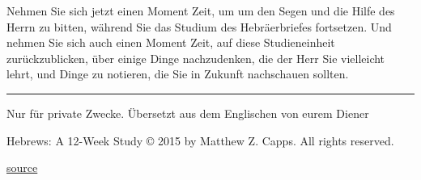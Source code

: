 \documentclass[]{krantz}
\begin{document}
Nehmen Sie sich jetzt einen Moment Zeit, um um den Segen und die Hilfe
des Herrn zu bitten, während Sie das Studium des Hebräerbriefes
fortsetzen. Und nehmen Sie sich auch einen Moment Zeit, auf diese
Studieneinheit zurückzublicken, über einige Dinge nachzudenken, die der
Herr Sie vielleicht lehrt, und Dinge zu notieren, die Sie in Zukunft
nachschauen sollten.

\begin{center}\rule{0.5\linewidth}{0.5pt}\end{center}

Nur für private Zwecke. Übersetzt aus dem Englischen von eurem Diener

Hebrews: A 12-Week Study © 2015 by Matthew Z. Capps. All rights
reserved.

\href{https://www.thegospelcoalition.org/course/knowing-bible-hebrews/\#week-3-jesus-is-superior-to-angelic-beings-heb-15-218}{source}


\end{document}
